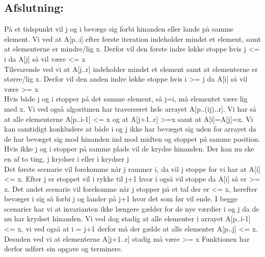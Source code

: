 \documentclass[10pt,a4paper,danish]{article}
\begin{document}
\subsection{Afslutning:}
\label{sec:afsl-it}
På et tidspunkt vil j og i bevæge sig forbi hinanden eller lande på samme element. 
Vi ved at A[p..i] efter første iteration indeholder mindst et element, samt at elementerne er mindre/lig x. Derfor vil den første indre løkke stoppe hvis j <= i da A[j] så vil være <= x
\\

Tilsvarende ved vi at A[j..r] indeholder mindst et element samt at elementerne er større/lig x. Derfor vil den anden indre løkke stoppe hvis i >= j da A[i] så vil være >= x
\\

Hvis bãde j og i stopper på det samme element, så j=i, må elementet være lig med x. Vi ved også algoritmen har traverseret hele arrayet A[p..(ij)..r]. Vi har så at alle elementerne A[p..i-1] <= x og at A[j+1..r] >=x samt at A[i]=A[j]=x.
Vi kan samtidigt konkludere at både i og j ikke har bevæget sig uden for arrayet da de har bevæget sig mod hinanden ind mod midten og stoppet på samme position.
\\

Hvis ikke j og i stopper på samme plads vil de krydse hinanden.
Der kan nu ske en af to ting, j krydser i eller i krydser j
\\

Det første scenarie vil forekomme når j rammer i, da vil j stoppe for vi har at A[i] <= x. Efter j er stoppet vil i rykke til j+1 hvor i også vil stoppe da A[i] så er >= x.
Det andet scenarie vil forekomme når j stopper på et tal der er <= x, herefter bevæger i sig så forbi j og lander på j+1 hvor det som før vil ende.
I begge scenarier har vi at invarianten ikke længere gælder for de nye værdier i og j da de nu har krydset hinanden. Vi ved dog stadig at alle elementer i arrayet A[p..i-1] <= x, vi ved også at i = j+1 derfor må der gælde at alle elementer A[p..j] <= x. Desuden ved vi at elementerne A[j+1..r] stadig må være >= x
Funktionen har derfor udført sin opgave og terminere. 
\\
\end{document}
